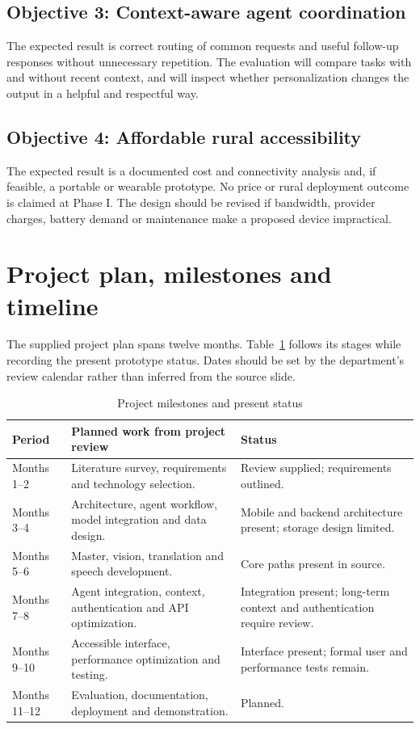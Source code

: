 \documentclass[12pt,a4paper,oneside]{report}
\begin{document}
\subsection{Objective 3: Context-aware agent coordination}
The expected result is correct routing of common requests and useful follow-up responses without unnecessary repetition. The evaluation will compare tasks with and without recent context, and will inspect whether personalization changes the output in a helpful and respectful way.

\subsection{Objective 4: Affordable rural accessibility}
The expected result is a documented cost and connectivity analysis and, if feasible, a portable or wearable prototype. No price or rural deployment outcome is claimed at Phase I. The design should be revised if bandwidth, provider charges, battery demand or maintenance make a proposed device impractical.

\section{Project plan, milestones and timeline}
The supplied project plan spans twelve months. Table~\ref{tab:milestones} follows its stages while recording the present prototype status. Dates should be set by the department's review calendar rather than inferred from the source slide.
\begin{table}[H]\centering\small\renewcommand{\arraystretch}{1.15}
\caption{Project milestones and present status}\label{tab:milestones}
\begin{tabularx}{\textwidth}{|p{}|p{}|X|}\hline
\textbf{Period} & \textbf{Planned work from project review} & \textbf{Status}\\\hline
Months 1--2 & Literature survey, requirements and technology selection. & Review supplied; requirements outlined.\\\hline
Months 3--4 & Architecture, agent workflow, model integration and data design. & Mobile and backend architecture present; storage design limited.\\\hline
Months 5--6 & Master, vision, translation and speech development. & Core paths present in source.\\\hline
Months 7--8 & Agent integration, context, authentication and API optimization. & Integration present; long-term context and authentication require review.\\\hline
Months 9--10 & Accessible interface, performance optimization and testing. & Interface present; formal user and performance tests remain.\\\hline
Months 11--12 & Evaluation, documentation, deployment and demonstration. & Planned.\\\hline
\end{tabularx}
\end{table}
\end{document}
